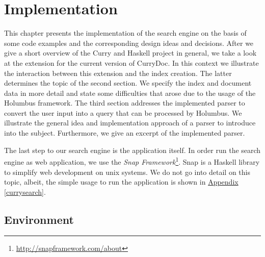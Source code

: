 \documentclass[%
	latex,%
	a4paper,%
	oneside,%
	chapterprefix,%
	headsepline,%
	12pt%
]{scrbook}
\begin{document}

\chapter{Implementation}\label{implementation}

This chapter presents the implementation of the search engine on the
basis of some code examples and the corresponding design ideas and
decisions. %
After we give a short overview of the Curry and Haskell project in
general, we take a look at the extension for the current version of
CurryDoc. %
In this context we illustrate the interaction between this extension
and the index creation. %
The latter determines the topic of the second section. %
We specify the index and document data in more detail and state some
difficulties that arose due to the usage of the Holumbus framework. %
The third section addresses the implemented parser to convert the user
input into a query that can be processed by Holumbus. %
We illustrate the general idea and implementation approach of a parser
to introduce into the subject. %
Furthermore, we give an excerpt of the implemented parser. %

The last step to our search engine is the application itself. %
In order run the search engine as web application, we use the
\emph{Snap
  Framework}\footnote{\url{http://snapframework.com/about}}. %
Snap is a Haskell library to simplify web development on unix
systems. %
We do not go into detail on this topic, albeit, the simple usage to
run the application is shown in \hyperref[currysearch]{Appendix
  \ref{currysearch}}. %

\section{Environment}
\end{document}
